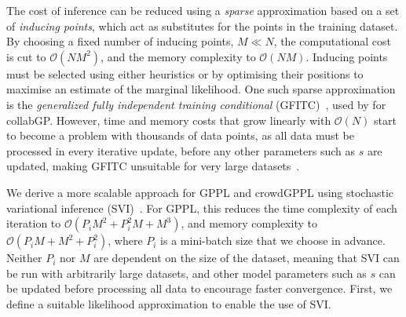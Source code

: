 The cost of inference can be reduced using a \emph{sparse} approximation based on a set of 
\emph{inducing points}, which act as substitutes for the points in the training dataset.
By choosing a fixed number of inducing points, $M \ll N$, the computational cost is cut to $\mathcal{O}(NM^2)$,
and the memory complexity to $\mathcal{O}(NM)$.
Inducing points must be selected %
using either heuristics or by optimising their positions to maximise an estimate of the 
marginal likelihood. 
One such sparse approximation is the \emph{generalized fully independent training conditional} (GFITC)~\citep{NIPS2007_3351,snelson2006sparse}, 
used by \citet{houlsby2012collaborative} for collabGP.
However, time and memory costs that grow linearly with $\mathcal{O}(N)$
start to become a problem with thousands of data points,
as all data must be processed in every iterative update,
before any other parameters such as $s$ are updated,
making GFITC unsuitable for very large datasets~\citep{hensman2015scalable}.

We derive a more scalable approach for GPPL and crowdGPPL using
stochastic variational inference (SVI)~\citep{hoffman2013stochastic}.
For GPPL, this reduces the time complexity of each iteration %
to $\mathcal{O}(P_i M^2 + P_i^2 M + M^3)$,
and memory complexity %
to $\mathcal{O}(P_i M + M^2  + P_i^2)$,
where $P_i$ is a mini-batch size that we choose in advance.
Neither $P_i$ nor $M$ are dependent on the size of the dataset, meaning that SVI 
can be run with arbitrarily large datasets, 
and other model parameters such as $s$ can be updated before processing all data
to encourage faster convergence.
First, we define a suitable likelihood approximation to enable the use of SVI.


